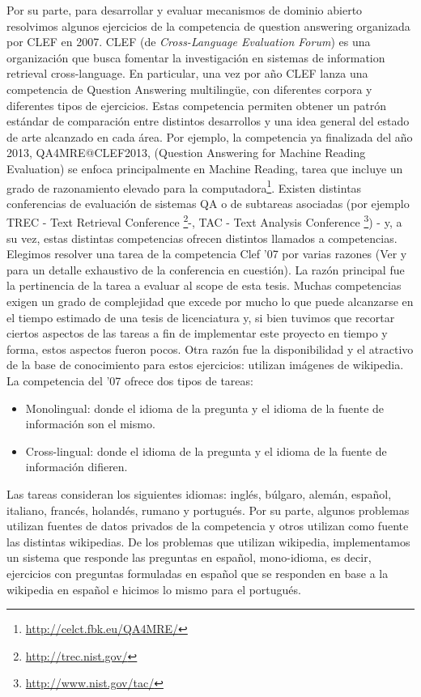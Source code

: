Por su parte, para desarrollar y evaluar mecanismos de dominio abierto resolvimos algunos ejercicios de la competencia de question answering organizada por CLEF
en 2007. CLEF (de \textit{Cross-Language Evaluation Forum}) es una organización que busca fomentar la investigación en sistemas de information retrieval cross-language. En particular, una vez por año CLEF lanza una competencia de Question Answering multilingüe, con diferentes corpora y diferentes tipos de ejercicios. Estas competencia permiten obtener un patrón estándar de comparación entre distintos desarrollos y una idea general del estado de arte alcanzado en cada área.
Por ejemplo, la competencia ya finalizada del año 2013, QA4MRE@CLEF2013, (Question Answering for Machine Reading Evaluation) se enfoca principalmente en Machine Reading, tarea que incluye un grado de razonamiento elevado para la computadora\footnote{\url{http://celct.fbk.eu/QA4MRE/}}. Existen distintas conferencias de evaluación de sistemas QA o de subtareas asociadas (por ejemplo TREC - Text Retrieval Conference \footnote{\url{http://trec.nist.gov/}}-, TAC - Text Analysis Conference \footnote{\url{http://www.nist.gov/tac/}}) - y, a su vez, estas distintas competencias ofrecen distintos llamados a competencias. Elegimos resolver una tarea de la competencia Clef '07  por varias razones (Ver \cite{GuidelineClef07} y \cite{OverviewClef07} para un detalle exhaustivo de la conferencia en cuestión). La razón principal fue la pertinencia de la tarea a evaluar al scope de esta tesis. Muchas competencias exigen un grado de complejidad que excede por mucho lo que puede alcanzarse en el tiempo estimado de una tesis de licenciatura y, si bien tuvimos que recortar ciertos aspectos de las tareas a fin de implementar este proyecto en tiempo y forma, estos aspectos fueron pocos.
Otra razón fue la disponibilidad y el atractivo de la base de conocimiento para estos ejercicios: utilizan imágenes de wikipedia.
La competencia del '07 ofrece dos tipos de tareas:
\begin{itemize}
\item Monolingual: donde el idioma de la pregunta y el idioma de la fuente de información son el mismo.
\item Cross-lingual: donde el idioma de la pregunta y el idioma de la fuente de información difieren.
\end{itemize}
Las tareas consideran los siguientes idiomas: inglés, búlgaro, alemán, español, italiano, francés, holandés, rumano y portugués. Por su parte, algunos problemas utilizan fuentes de datos privados de la competencia y otros utilizan como fuente las distintas wikipedias. De los problemas que utilizan wikipedia, implementamos un sistema que responde las preguntas en español, mono-idioma, es decir, ejercicios con preguntas formuladas en español que se responden en base a la wikipedia en español e hicimos lo mismo para el portugués.

